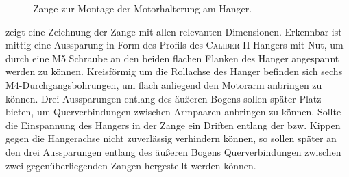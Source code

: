 		\begin{figure}[h]
			\centering
			
			\caption[Zange zur Montage der Motorhalterung am Hanger]{Zange zur Montage der Motorhalterung am Hanger.}%
			\label{fig:hanger clamp drawing}
		\end{figure}
		 zeigt eine Zeichnung der Zange mit allen relevanten Dimensionen.
		Erkennbar ist mittig eine Aussparung in Form des Profils des \textsc{Caliber II} Hangers mit Nut, um durch eine M5 Schraube an den beiden flachen Flanken des Hanger angespannt werden zu können.
		Kreisförmig um die Rollachse des Hanger befinden sich sechs M4-Durchgangsbohrungen, um flach anliegend den Motorarm anbringen zu können.
		Drei Aussparungen entlang des äußeren Bogens sollen später Platz bieten, um Querverbindungen zwischen Armpaaren anbringen zu können.
		Sollte die Einspannung des Hangers in der Zange ein Driften entlang der bzw. Kippen gegen die Hangerachse nicht zuverlässig verhindern können, so sollen später an den drei Aussparungen entlang des äußeren Bogens Querverbindungen zwischen zwei gegenüberliegenden Zangen hergestellt werden können.

